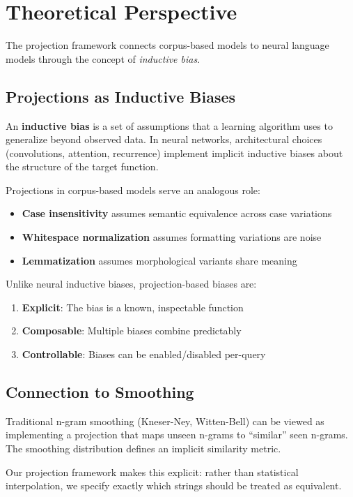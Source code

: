 \documentclass[11pt]{article}
\begin{document}
\section{Theoretical Perspective}

The projection framework connects corpus-based models to neural language models through the concept of \emph{inductive bias}.

\subsection{Projections as Inductive Biases}

An \textbf{inductive bias} is a set of assumptions that a learning algorithm uses to generalize beyond observed data. In neural networks, architectural choices (convolutions, attention, recurrence) implement implicit inductive biases about the structure of the target function.

Projections in corpus-based models serve an analogous role:
\begin{itemize}
    \item \textbf{Case insensitivity} assumes semantic equivalence across case variations
    \item \textbf{Whitespace normalization} assumes formatting variations are noise
    \item \textbf{Lemmatization} assumes morphological variants share meaning
\end{itemize}

Unlike neural inductive biases, projection-based biases are:
\begin{enumerate}
    \item \textbf{Explicit}: The bias is a known, inspectable function
    \item \textbf{Composable}: Multiple biases combine predictably
    \item \textbf{Controllable}: Biases can be enabled/disabled per-query
\end{enumerate}

\subsection{Connection to Smoothing}

Traditional n-gram smoothing (Kneser-Ney, Witten-Bell) can be viewed as implementing a projection that maps unseen n-grams to ``similar'' seen n-grams. The smoothing distribution defines an implicit similarity metric.

Our projection framework makes this explicit: rather than statistical interpolation, we specify exactly which strings should be treated as equivalent.
\end{document}
